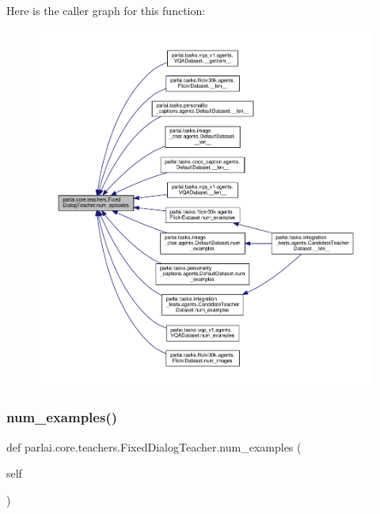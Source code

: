 Here is the caller graph for this function\+:
\nopagebreak
\begin{figure}[H]
\begin{center}
\leavevmode
\includegraphics[width=350pt]{classparlai_1_1core_1_1teachers_1_1FixedDialogTeacher_a51e3463e7b7b44a6ea8b43fc82aacb75_icgraph}
\end{center}
\end{figure}
\mbox{\label{classparlai_1_1core_1_1teachers_1_1FixedDialogTeacher_a38bd0d5c98506c45eb87d6db32d1c0bf}} 
\subsubsection{\texorpdfstring{num\+\_\+examples()}{num\_examples()}}
{\footnotesize\ttfamily def parlai.\+core.\+teachers.\+Fixed\+Dialog\+Teacher.\+num\+\_\+examples (\begin{DoxyParamCaption}\item[{}]{self }\end{DoxyParamCaption})}

